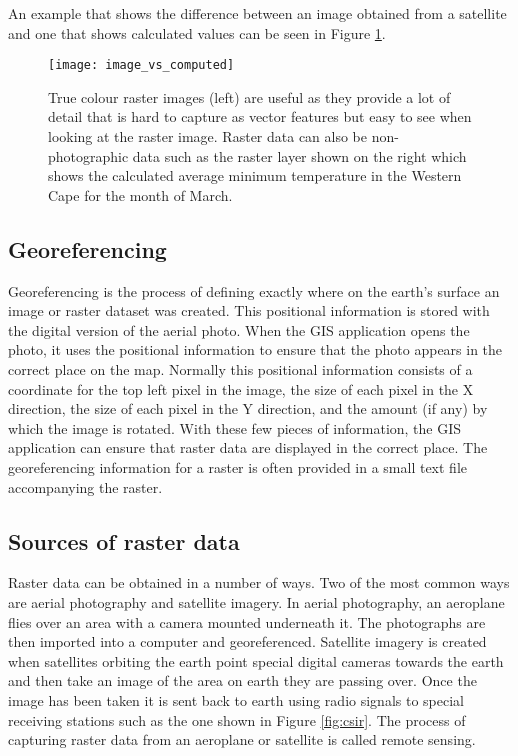 An example that shows the difference between an image obtained from a
satellite and one that shows calculated values can be seen in Figure
\ref{fig:imgcomp}.

\begin{figure}[ht]
   \begin{center}
   \caption{True colour raster images (left) are useful as they provide a lot
of detail that is hard to capture as vector features but easy to see when
looking at the raster image. Raster data can also be non-photographic data
such as the raster layer shown on the right which shows the calculated
average minimum temperature in the Western Cape for the month of March.}
\label{fig:imgcomp}\smallskip
   \texttt{[image: image\_vs\_computed]}
\end{center}
\end{figure}

\subsection{Georeferencing}

Georeferencing is the process of defining exactly where on the earth's
surface an image or raster dataset was created. This positional information
is stored with the digital version of the aerial photo. When the GIS
application opens the photo, it uses the positional information to ensure
that the photo appears in the correct place on the map. Normally this
positional information consists of a coordinate for the top left pixel in the
image, the size of each pixel in the X direction, the size of each pixel in
the Y direction, and the amount (if any) by which the image is rotated. With
these few pieces of information, the GIS application can ensure that raster
data are displayed in the correct place. The georeferencing information for a
raster is often provided in a small text file accompanying the raster.

\subsection{Sources of raster data}

Raster data can be obtained in a number of ways. Two of the most common ways
are aerial photography and satellite imagery. In aerial photography, an
aeroplane flies over an area with a camera mounted underneath it. The
photographs are then imported into a computer and georeferenced. Satellite
imagery is created when satellites orbiting the earth point special digital
cameras towards the earth and then take an image of the area on earth they
are passing over. Once the image has been taken it is sent back to earth
using radio signals to special receiving stations such as the one shown in
Figure \ref{fig:csir}. The process of capturing raster data from an aeroplane
or satellite is called remote sensing.

